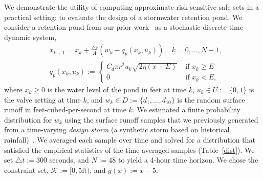 \documentclass[letterpaper, 10 pt, conference]{ieeeconf}  %
\begin{document}
We demonstrate the utility of computing approximate risk-sensitive safe sets in a practical setting:
to evaluate the design of a stormwater retention pond. We consider a retention pond from our prior work~\cite{sustech} as a stochastic discrete-time dynamic system,\footnotemark
{}
\begin{equation}\begin{aligned}
& x_{k+1} = x_k + \frac{\triangle t}{A} (w_k - q_p(x_k, u_k)), \text{ }k = 0, \dots, N-1, \\
& q_p(x_k,u_k) := \begin{cases} C_d \pi r^2 u_k \sqrt{ 2\eta(x-E) } & \text{ if } x_k \geq E \\
						0 & \text{ if } x_k < E, \end{cases}
\end{aligned}\label{watersys}\end{equation}
where $x_k \geq 0$ is the water level of the pond in feet at time $k$, $u_k \in U := \{0, 1\}$ is the valve setting at time $k$,
and $w_k \in D := \{d_1, \dots, d_{10}\}$ is the random surface runoff in feet-cubed-per-second at time $k$.
We estimated a finite probability distribution for $w_k$ using the surface runoff samples that we previously generated from a time-varying \textit{design storm}
(a synthetic storm based on historical rainfall)~\cite{sustech}. 
We averaged each sample over time and solved for a distribution that satisfied the empirical statistics of the time-averaged samples (Table~\ref{dist}). 
We set $\triangle t := 300$ seconds, and $N := 48$ to yield a 4-hour time horizon.
We chose the constraint set, $\mathcal{K} := [0, 5\text{ft})$, and $g(x) := x - 5$.
%
\end{document}

